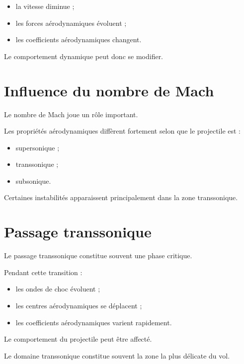 \begin{itemize}
    \item la vitesse diminue ;
    \item les forces aérodynamiques évoluent ;
    \item les coefficients aérodynamiques changent.
\end{itemize}

Le comportement dynamique peut donc se modifier.

\section{Influence du nombre de Mach}

Le nombre de Mach joue un rôle important.

Les propriétés aérodynamiques diffèrent fortement selon que le projectile est :

\begin{itemize}
    \item supersonique ;
    \item transsonique ;
    \item subsonique.
\end{itemize}

Certaines instabilités apparaissent principalement dans la zone
transsonique.

\section{Passage transsonique}

Le passage transsonique constitue souvent une phase critique.

Pendant cette transition :

\begin{itemize}
    \item les ondes de choc évoluent ;
    \item les centres aérodynamiques se déplacent ;
    \item les coefficients aérodynamiques varient rapidement.
\end{itemize}

Le comportement du projectile peut être affecté.

\begin{aretenir}

Le domaine transsonique constitue souvent la zone la plus délicate du vol.

\end{aretenir}

